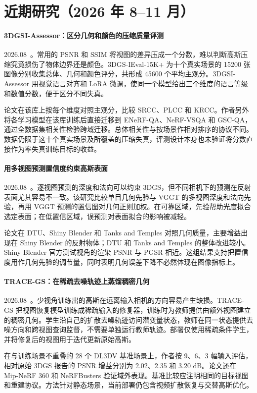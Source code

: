 \section{近期研究（2026 年 8--11 月）}
\paragraph{3DGSI-Assessor：区分几何和颜色的压缩质量评测}
2026.08~\cite{2608_03279}。常用的 PSNR 和 SSIM 将视图的差异压成一个分数，难以判断高斯压缩究竟损伤了物体边界还是颜色。3DGS-IEval-15K+ 为十个真实场景的 15200 张图像分别收集总体、几何和颜色评分，共形成 45600 个平均主观分。3DGSI-Assessor 用视觉语言对齐和 LoRA 微调，使同一个模型给出三个维度的语言等级和数值分数，便于区分不同失真。

论文在该库上按每个维度对照主观分，比较 SRCC、PLCC 和 KRCC。作者另外将各学习模型在该库训练后直接迁移到 ENeRF-QA、NeRF-VSQA 和 GSC-QA，通过全数据集相关性检验跨域迁移。总体相关性与按场景作相对排序的协议不同。数据仍限于这十个真实场景及所覆盖的压缩失真，评测设计本身也未验证将分数直接作为率失真训练目标的收益。

\paragraph{用多视图预测置信度约束高斯表面}
2026.08~\cite{2608_06117}。逐视图预测的深度和法向可以约束 3DGS，但不同相机下的预测在反射表面尤其容易不一致。该研究比较单目几何先验与 VGGT 的多视图深度和法向先验，再用 VGGT 预测的置信图对几何正则加权。在可靠区域，先验帮助光度拟合选定表面；在低置信区域，误预测对表面拟合的影响被减轻。

论文在 DTU、Shiny Blender 和 Tanks and Temples 对照几何质量，主要增益出现在 Shiny Blender 的反射物体；DTU 和 Tanks and Temples 的整体改进较小。Shiny Blender 官方测试视角的渲染 PSNR 与 PGSR 相近。这组结果支持把置信度用作几何先验的调节量，同时表明几何误差下降不必然体现在图像指标上。

\paragraph{TRACE-GS：在稀疏去噪轨迹上蒸馏稠密几何}
2026.08~\cite{2608_10286}。少视角训练出的高斯在远离输入相机的方向容易产生缺损。TRACE-GS 把视图恢复模型训练成稀疏输入的修复器，训练时为教师提供由额外视图建立的稠密几何。学生沿自己的扩散去噪轨迹访问潜变量状态，教师在同一状态提供去噪方向和跨视图查询监督，不需要单独运行教师轨迹。部署仅使用稀疏条件学生，并将修复后的视图用于迭代更新原始高斯。

在与训练场景不重叠的 28 个 DL3DV 基准场景上，作者按 9、6、3 幅输入评估，相对原始 3DGS 报告的 PSNR 增益分别为 2.02、2.35 和 3.20 dB。论文还在 Mip-NeRF 360 和 NeRFBusters 验证域外表现。基准比较应注明相同的目标视图和重建协议。方法针对静态场景，当前部署仍包含视频扩散恢复与交替高斯优化。

